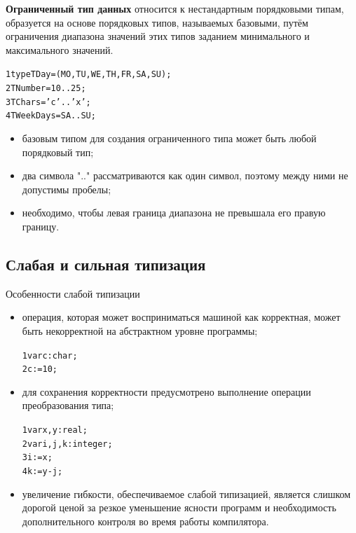 \documentclass{beamer}
\begin{document}
\begin{frame}[fragile]
\textbf{Ограниченный тип данных} относится к нестандартным порядковыми
типам, образуется на основе порядковых типов, называемых базовыми,
путём ограничения диапазона значений этих типов заданием минимального и максимального значений.
\begin{alltt}
1  type TDay = (MO, TU, WE, TH, FR, SA, SU);
2       TNumber = 10..25;
3       TChars = 'c'..'x';
4       TWeekDays = SA..SU;
\end{alltt}
\begin{itemize}
\item базовым типом для создания ограниченного типа может быть любой
порядковый тип;
\item два символа ".." рассматриваются как один символ, поэтому между
ними не допустимы пробелы;
\item необходимо, чтобы левая граница диапазона не превышала его правую
границу.
\end{itemize}
\end{frame}
   
\subsection{Слабая и сильная типизация}
\begin{frame}[fragile]
\begin{block}{Особенности слабой типизации}
\begin{itemize}
\item операция, которая может восприниматься машиной как корректная,
может быть некорректной на абстрактном уровне программы;
\begin{alltt}
1  var c: char;
2  c := 10;
\end{alltt}
\item для сохранения корректности предусмотрено выполнение операции преобразования типа;
\begin{alltt}
1  var x,y: real; 
2  var i,j,k: integer; 
3  i := x;
4  k := y - j;
\end{alltt}
\item увеличение гибкости, обеспечиваемое слабой типизацией, является слишком дорогой ценой за резкое уменьшение ясности программ и необходимость дополнительного контроля во время работы компилятора.	
\end{itemize}
\end{block}
\end{frame}   
\end{document}
